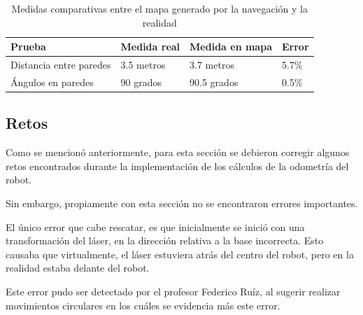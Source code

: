 \begin{table}[]
  \centering
  \begin{tabular}{@{}llll@{}}
  \toprule
  \textbf{Prueba} & \textbf{Medida real} & \textbf{Medida en mapa} & \textbf{Error} \\ \midrule
  Distancia entre paredes & 3.5 metros & 3.7 metros & 5.7\% \\
  Ángulos en paredes & 90 grados & 90.5 grados & 0.5\% \\ \bottomrule
  \end{tabular}
  \caption{Medidas comparativas entre el mapa generado por la navegación y la realidad}
  \label{tab:medidas_comparativas}
  \end{table}

\subsection{Retos}

Como se mencionó anteriormente, para esta sección se debieron corregir algunos
retos encontrados durante la implementación de los cálculos de la
odometría del robot.

Sin embargo, propiamente con esta sección no se encontraron errores importantes.

El único error que cabe rescatar, es que inicialmente se inició con una
transformación del láser, en la dirección relativa a la base incorrecta.
Esto causaba que virtualmente, el láser estuviera atrás del centro del robot,
pero en la realidad estaba delante del robot.

Este error pudo ser detectado por el profesor Federico Ruíz, al sugerir
realizar movimientos circulares en los cuáles se evidencia más este error.

